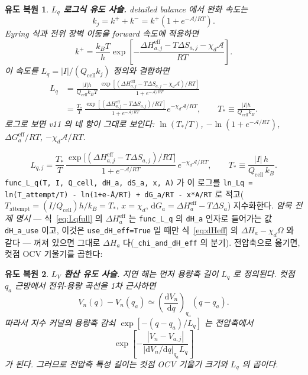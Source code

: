 \documentclass[11pt,a4paper]{article}
\newtheorem*{derivebox}{유도 복원}
\newcommand{\dd}{\mathrm{d}}
\newcommand{\eff}{\mathrm{eff}}
\newcommand{\cell}{\mathrm{cell}}
\newcommand{\code}[1]{\texttt{#1}}
\begin{document}
\begin{derivebox}
\textbf{$L_q$ 로그식 유도 사슬.} detailed balance 에서 완화 속도는
\begin{equation*}
k_j=k^++k^-=k^+(1+e^{-\mathcal A/RT}).
\end{equation*}
Eyring 식과 전위 장벽 이동을 forward 속도에 적용하면
\begin{equation*}
k^+=\frac{k_BT}{h}\exp\!\left[-\frac{\Delta H_{a,j}^{\eff}-T\Delta S_{a,j}-\chi_d\mathcal A}{RT}\right].
\end{equation*}
이 속도를 $L_q=|I|/(Q_{\cell}k_j)$ 정의와 결합하면
\begin{align*}
L_q&=\frac{|I|h}{Q_{\cell}k_BT}\,
\frac{\exp[(\Delta H_{a,j}^{\eff}-T\Delta S_{a,j}-\chi_d\mathcal A)/RT]}{1+e^{-\mathcal A/RT}}\\
&=\frac{T_*}{T}\,\frac{\exp[(\Delta H_{a,j}^{\eff}-T\Delta S_{a,j})/RT]}{1+e^{-\mathcal A/RT}}e^{-\chi_d\mathcal A/RT},
\qquad T_*\equiv\frac{|I|h}{Q_{\cell}k_B}.
\end{align*}
로그로 보면 v11 의 네 항이 그대로 보인다: $\ln(T_*/T)$, $-\ln(1+e^{-\mathcal A/RT})$, $\Delta G_a^{\eff}/RT$, $-\chi_d\mathcal A/RT$.
\end{derivebox}

\begin{equation}
L_{q,j}=\frac{T_*}{T}\,\frac{\exp\!\big[(\Delta H_{a,j}^\eff-T\Delta S_{a,j})/RT\big]}{1+e^{-\mathcal A/RT}}
\,e^{-\chi_d\mathcal A/RT},
\qquad T_*\equiv\frac{|I|\,h}{Q_\cell\,k_B}.
\label{eq:Lqfull}
\end{equation}
\code{func\_L\_q(T, I, Q\_cell, dH\_a, dS\_a, x, A)} 가 이 로그를
\code{ln\_Lq = ln(T\_attempt/T) - ln(1+e\^{-A/RT}) + dG\_a/RT - x*A/RT} 로 적고($T_\mathrm{attempt}=(I/Q_\cell)h/k_B=T_*$,
$x=\chi_d$, $\dd G_a=\Delta H_a^\eff-T\Delta S_a$) 지수화한다. \emph{암묵 전제 명시} — 식~\eqref{eq:Lqfull} 의
$\Delta H_a^\eff$ 는 \code{func\_L\_q} 의 \code{dH\_a} 인자로 들어가는 값 \code{dH\_a\_use} 이고, 이것은
\code{use\_dH\_eff=True} 일 때만 식~\eqref{eq:dHeff} 의 $\Delta H_a-\chi_d\Omega$ 와 같다 — 꺼져 있으면 그대로
$\Delta H_a$ 다(\code{\_chi\_and\_dH\_eff} 의 분기). 전압축으로 옮기면, 컷점 OCV 기울기를 곱한다:

\begin{derivebox}
\textbf{$L_V$ 환산 유도 사슬.} 지연 해는 먼저 용량축 길이 $L_q$ 로 정의된다. 컷점 $q_a$ 근방에서 전위-용량 곡선을 1차 근사하면
\begin{equation*}
V_n(q)-V_n(q_a)\simeq \left(\frac{\dd V_n}{\dd q}\right)_{q_a}(q-q_a).
\end{equation*}
따라서 지수 커널의 용량축 감쇠 $\exp[-(q-q_a)/L_q]$ 는 전압축에서
\begin{equation*}
\exp\!\left[-\frac{|V_n-V_{a,j}|}{|\dd V_n/\dd q|_{q_a}L_q}\right]
\end{equation*}
가 된다. 그러므로 전압축 특성 길이는 컷점 OCV 기울기 크기와 $L_q$ 의 곱이다.
\end{derivebox}
\end{document}
